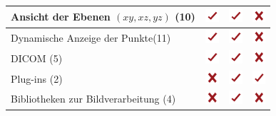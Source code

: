 \begin{table}
\begin{tabularx}{\textwidth}{|p{7cm}|X|X|X|}
    Ansicht der Ebenen  $(xy, xz, yz)$ (10)			& \includegraphics[width=0.5cm]{./img/yes.pdf} & \includegraphics[width=0.5cm]{./img/yes.pdf} & \includegraphics[width=0.5cm]{./img/no.pdf} \\ \hline
    Dynamische Anzeige der Punkte(11)	&\includegraphics[width=0.5cm]{./img/yes.pdf} & \includegraphics[width=0.5cm]{./img/yes.pdf}  & \includegraphics[width=0.5cm]{./img/no.pdf}\\ \hline
    DICOM (5)									    & \includegraphics[width=0.5cm]{./img/yes.pdf}	& \includegraphics[width=0.5cm]{./img/yes.pdf}	& \includegraphics[width=0.5cm]{./img/no.pdf}\\ \hline	
    Plug-ins (2)		 							& \includegraphics[width=0.5cm]{./img/no.pdf}	& \includegraphics[width=0.5cm]{./img/yes.pdf} 	& \includegraphics[width=0.5cm]{./img/yes.pdf}  \\ \hline
    Bibliotheken zur Bildverarbeitung (4)		 	& \includegraphics[width=0.5cm]{./img/no.pdf}			& \includegraphics[width=0.5cm]{./img/yes.pdf}  		  		& \includegraphics[width=0.5cm]{./img/no.pdf}  \\ \hline

\end{tabularx}
\end{table}
